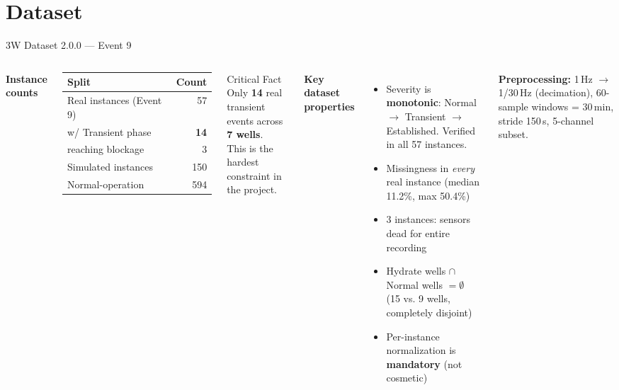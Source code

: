 \documentclass[aspectratio=169,10pt]{beamer}
\begin{document}
\section{Dataset}

\begin{frame}{3W Dataset 2.0.0 — Event 9}
  \begin{columns}
      \textbf{Instance counts}
      \begin{table}
        \begin{tabular}{lr}
          \toprule
          Split & Count \\
          \midrule
          Real instances (Event 9) & 57 \\
          \quad w/ Transient phase & \textbf{14} \\
          \quad reaching blockage & 3 \\
          Simulated instances & 150 \\
          Normal-operation & 594 \\
          \bottomrule
        \end{tabular}
      \end{table}
      \vspace{0.4em}
      \begin{alertblock}{Critical Fact}
        Only \textbf{14} real transient events across \textbf{7 wells}.\\
        This is the hardest constraint in the project.
      \end{alertblock}
      \textbf{Key dataset properties}
      \begin{itemize}
        \item Severity is \textbf{monotonic}: Normal $\to$ Transient $\to$ Established. Verified in all 57 instances.
        \item Missingness in \textit{every} real instance (median 11.2\%, max 50.4\%)
        \item 3 instances: sensors dead for entire recording
        \item Hydrate wells $\cap$ Normal wells $= \emptyset$\\(15 vs. 9 wells, completely disjoint)
        \item Per-instance normalization is \textbf{mandatory} (not cosmetic)
      \end{itemize}
      \vspace{0.4em}
      \textbf{Preprocessing:} 1\,Hz $\to$ 1/30\,Hz (decimation), 60-sample windows = 30\,min, stride 150\,s, 5-channel subset.
  \end{columns}
\end{frame}
\end{document}
